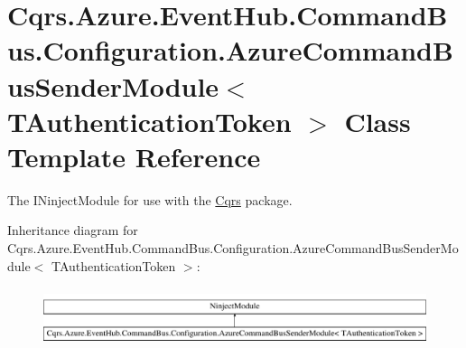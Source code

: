 \hypertarget{classCqrs_1_1Azure_1_1EventHub_1_1CommandBus_1_1Configuration_1_1AzureCommandBusSenderModule}{}\section{Cqrs.\+Azure.\+Event\+Hub.\+Command\+Bus.\+Configuration.\+Azure\+Command\+Bus\+Sender\+Module$<$ T\+Authentication\+Token $>$ Class Template Reference}
\label{classCqrs_1_1Azure_1_1EventHub_1_1CommandBus_1_1Configuration_1_1AzureCommandBusSenderModule}


The I\+Ninject\+Module for use with the \hyperlink{namespaceCqrs}{Cqrs} package.  


Inheritance diagram for Cqrs.\+Azure.\+Event\+Hub.\+Command\+Bus.\+Configuration.\+Azure\+Command\+Bus\+Sender\+Module$<$ T\+Authentication\+Token $>$\+:\begin{figure}[H]
\begin{center}
\leavevmode
\includegraphics[height=1.736434cm]{classCqrs_1_1Azure_1_1EventHub_1_1CommandBus_1_1Configuration_1_1AzureCommandBusSenderModule}
\end{center}
\end{figure}
